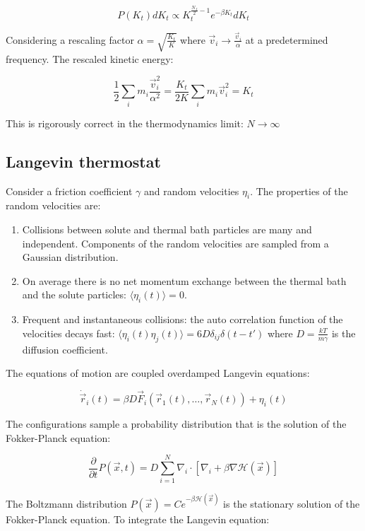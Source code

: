	$$P(K_t)dK_t\propto K_t^{\frac{N_f}{2}-1}e^{-\beta K_t}d K_t$$

	Considering a rescaling factor $\alpha = \sqrt{\frac{K_t}{K}}$ where $\vec{v}_i \rightarrow \frac{\vec{v}_i}{\alpha}$ at a predetermined frequency.
	The rescaled kinetic energy:

	$$\frac{1}{2}\sum\limits_{i}m_i\frac{\vec{v}_i^2}{\alpha^2} = \frac{K_t}{2K}\sum\limits_{i}m_i\vec{v}_i^2 = K_t$$

	This is rigorously correct in the thermodynamics limit: $N\rightarrow\infty$

	\subsection{Langevin thermostat}
	Consider a friction coefficient $\gamma$ and random velocities $\eta_i$.
	The properties of the random velocities are:

	\begin{multicols}{2}
		\begin{enumerate}
			\item Collisions between solute and thermal bath particles are many and independent.
				Components of the random velocities are sampled from a Gaussian distribution.
			\item On average there is no net momentum exchange between the thermal bath and the solute particles: $\langle\eta_i(t)\rangle = 0$.
			\item Frequent and instantaneous collisions: the auto correlation function of the velocities decays fast: $\langle\eta_i(t)\eta_j(t)\rangle = 6D\delta_{ij}\delta(t-t')$ where $D = \frac{kT}{m\gamma}$ is the diffusion coefficient.
		\end{enumerate}
	\end{multicols}

	The equations of motion are coupled overdamped Langevin equations:

	$$\dot{\vec{r}}_i(t) = \beta D\vec{F}_i(\vec{r}_1(t), \dots, \vec{r}_N(t)) + \eta_i(t)$$

	The configurations sample a probability distribution that is the solution of the Fokker-Planck equation:

	$$\frac{\partial}{\partial t}P(\vec{x}, t) = D\sum\limits_{i=1}^{N}\nabla_i\cdot[\nabla_i+\beta\nabla\mathcal{H}(\vec{x})]$$

	The Boltzmann distribution $P(\vec{x}) = Ce^{-\beta\mathcal{H}(\vec{x})}$ is the stationary solution of the Fokker-Planck equation.
	To integrate the Langevin equation:

